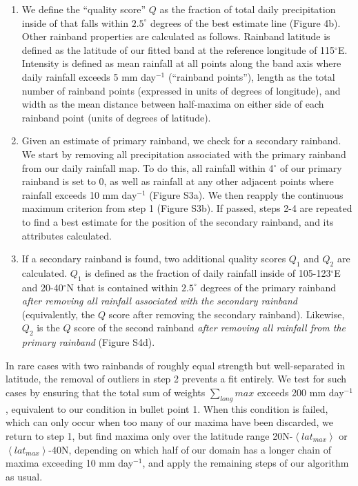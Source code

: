\documentclass[final,grl]{agutexSI}
\begin{document}
\begin{article}
\begin{enumerate}
	\item We define the ``quality score'' $Q$ as the fraction of total daily precipitation inside of  that falls within $2.5^{\circ}$ degrees of the best estimate line (Figure 4b). Other rainband properties are calculated as follows. Rainband latitude is defined as the latitude of our fitted band at the reference longitude of 115$^{\circ}$E. Intensity is defined as mean rainfall at all points along the band axis where daily rainfall exceeds 5 mm day$^{-1}$ (``rainband points''), length as the total number of rainband points (expressed in units of degrees of longitude), and width as the mean distance between half-maxima on either side of each rainband point (units of degrees of latitude).
	
	\item Given an estimate of primary rainband, we check for a secondary rainband. We start by removing all precipitation associated with the primary rainband from our daily rainfall map. To do this, all rainfall within 4$^{\circ}$ of our primary rainband is set to 0, as well as rainfall at any other adjacent points where rainfall exceeds 10 mm day$^{-1}$ (Figure S3a). We then reapply the continuous maximum criterion from step 1 (Figure S3b). If passed, steps 2-4 are repeated to find a best estimate for the position of the secondary rainband, and its attributes calculated.
	
	\item If a secondary rainband is found, two additional quality scores $Q_1$ and $Q_2$ are calculated. $Q_1$ is defined as the fraction of daily rainfall inside of 105-123$^{\circ}$E and 20-40$^{\circ}$N that is contained within $2.5^{\circ}$ degrees of the primary rainband \textit{after removing all rainfall associated with the secondary rainband} (equivalently, the $Q$ score after removing the secondary rainband). Likewise, $Q_2$ is the $Q$ score of the second rainband \textit{after removing all rainfall from the primary rainband} (Figure S4d).		
	
\end{enumerate} 

In rare cases with two rainbands of roughly equal strength but well-separated in latitude, the removal of outliers in step 2 prevents a fit entirely. We test for such cases by ensuring that the total sum of weights ${\sum_{long} max}$ exceeds 200 mm day$^{-1}$, equivalent to our condition in bullet point 1. When this condition is failed, which can only occur when too many of our maxima have been discarded, we return to step 1, but find maxima only over the latitude range 20N-$\left<lat_{max}\right>$ or $\left<lat_{max}\right>$-40N, depending on which half of our domain has a longer chain of maxima exceeding 10 mm day$^{-1}$, and apply the remaining steps of our algorithm as usual.


\end{article}
\end{document}
